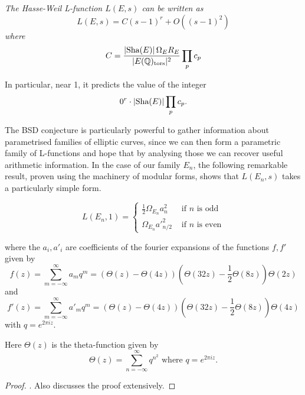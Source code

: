 \documentclass[12pt, a4paper]{amsart}
\begin{document}
\begin{conj} \normalfont
  \textit{The Hasse-Weil L-function $L(E,s)$ can be written as
  \[L(E,s) = C (s-1)^r + O((s-1)^2)\] where}
\begin{equation} \label{eq:bsd}
  C = \frac{|\text{Sha}(E)| \, \Omega_E R_E}{|E({\mathbb Q})_{\text{tors}}|^2} \prod_p c_p
\end{equation}
\end{conj}

In particular, near 1, it predicts the value of the integer
\[0^r \cdot | \text{\normalfont Sha}(E)| \prod_p c_p .\]

The BSD conjecture is particularly powerful to gather information about
parametrised families of elliptic curves, since we can then form a parametric
family of L-functions and hope that by analysing those we can recover useful
arithmetic information.
In the case of our family $E_n$, the following remarkable result, proven using
the machinery of modular forms, shows that
$L(E_n,s)$ takes a particularly simple form.

\begin{thm}
  \begin{equation} \label{eq:tunnell}
    L(E_n,1) = \begin{cases}
      \frac{1}{2}\Omega_{E_n}a^2_n & \text{ if $n$ is odd} \\
      \Omega_{E_n}a'^2_{n/2} & \text{ if $n$ is even}
    \end{cases}
  \end{equation}

  where the $a_i, a'_i$ are coefficients of the fourier expansions of the
  functions $f, f'$ given by
  \begin{equation} \label{eq:mododd}
    f(z) = \sum\limits_{m=-\infty}^\infty a_m q^m
    = (\Theta(z) - \Theta(4z)) (\Theta(32z)-\frac{1}{2} \Theta(8z)) \Theta(2z)
  \end{equation}
  and
  \begin{equation} \label{eq:modeven}
    f'(z) = \sum\limits_{m=-\infty}^\infty a'_m q^m =
    (\Theta(z) - \Theta(4z)) (\Theta(32z)-\frac{1}{2} \Theta(8z)) \Theta(4z)
  \end{equation}
  with $q = e^{2\pi i z}$.
  
  Here $\Theta(z)$ is the theta-function given by
  \[ \Theta(z) = \sum\limits_{n = -\infty}^{\infty} q^{n^2} \text{ where } q =
    e^{2\pi iz}.\]
\end{thm}

\begin{proof}
  \cite[See][pages 325-328]{Tunnell}. Also \cite[pages 212-222]{modular}
  discusses the proof extensively.
\end{proof}
  
\end{document}
